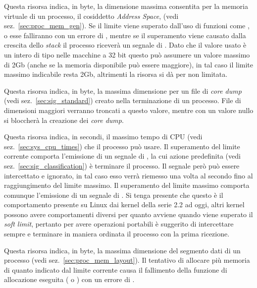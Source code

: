 \begin{basedescript}{\desclabelwidth{2.2cm}}%
\item[\constd{RLIMIT\_AS}] Questa risorsa indica, in byte, la dimensione
  massima consentita per la memoria virtuale di un processo, il cosiddetto
  \textit{Address Space}, (vedi sez.~\ref{sec:proc_mem_gen}). Se il limite
  viene superato dall'uso di funzioni come ,  o
   esse falliranno con un errore di , mentre se il
  superamento viene causato dalla crescita dello \textit{stack} il processo
  riceverà un segnale di . Dato che il valore usato è un
  intero di tipo  nelle macchine a 32 bit questo può assumere un
  valore massimo di 2Gb (anche se la memoria disponibile può essere maggiore),
  in tal caso il limite massimo indicabile resta 2Gb, altrimenti la risorsa si
  dà per non limitata.

\item[\constd{RLIMIT\_CORE}] Questa risorsa indica, in byte, la massima
  dimensione per un file di \textit{core dump} (vedi
  sez.~\ref{sec:sig_standard}) creato nella terminazione di un processo. File
  di dimensioni maggiori verranno troncati a questo valore, mentre con un
  valore nullo si bloccherà la creazione dei \textit{core dump}.

\item[\constd{RLIMIT\_CPU}] Questa risorsa indica, in secondi, il massimo tempo
  di CPU (vedi sez.~\ref{sec:sys_cpu_times}) che il processo può usare. Il
  superamento del limite corrente comporta l'emissione di un segnale di
  , la cui azione predefinita (vedi
  sez.~\ref{sec:sig_classification}) è terminare il processo. Il segnale però
  può essere intercettato e ignorato, in tal caso esso verrà riemesso una
  volta al secondo fino al raggiungimento del limite massimo. Il superamento
  del limite massimo comporta comunque l'emissione di un segnale di
  . Si tenga presente che questo è il comportamento presente
  su Linux dai kernel della serie 2.2 ad oggi, altri kernel possono avere
  comportamenti diversi per quanto avviene quando viene superato il
  \textit{soft limit}, pertanto per avere operazioni portabili è suggerito di
  intercettare sempre  e terminare in maniera ordinata il
  processo con la prima ricezione.

\item[\constd{RLIMIT\_DATA}] Questa risorsa indica, in byte, la massima
  dimensione del segmento dati di un processo (vedi
  sez.~\ref{sec:proc_mem_layout}).  Il tentativo di allocare più memoria di
  quanto indicato dal limite corrente causa il fallimento della funzione di
  allocazione eseguita ( o ) con un errore di
  .


\end{basedescript}
